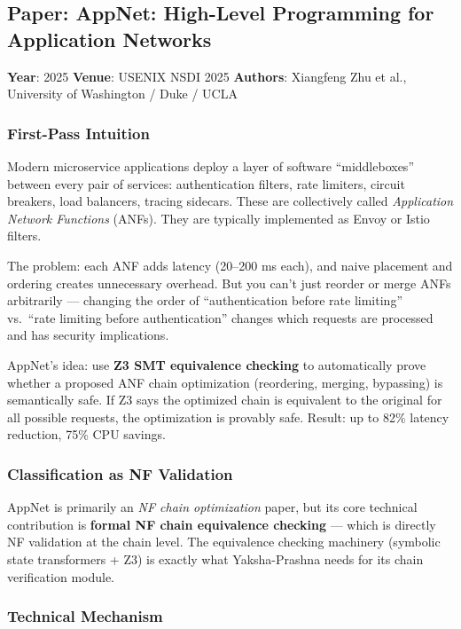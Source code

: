 \subsection*{Paper: AppNet: High-Level Programming for Application Networks}
\textbf{Year}: 2025 \quad \textbf{Venue}: USENIX NSDI 2025 \quad \textbf{Authors}: Xiangfeng Zhu et al., University of Washington / Duke / UCLA

\subsubsection{First-Pass Intuition}

Modern microservice applications deploy a layer of software ``middleboxes'' between every pair of services: authentication filters, rate limiters, circuit breakers, load balancers, tracing sidecars. These are collectively called \emph{Application Network Functions} (ANFs). They are typically implemented as Envoy or Istio filters.

The problem: each ANF adds latency (20--200 ms each), and naive placement and ordering creates unnecessary overhead. But you can't just reorder or merge ANFs arbitrarily --- changing the order of ``authentication before rate limiting'' vs.\ ``rate limiting before authentication'' changes which requests are processed and has security implications.

AppNet's idea: use \textbf{Z3 SMT equivalence checking} to automatically prove whether a proposed ANF chain optimization (reordering, merging, bypassing) is semantically safe. If Z3 says the optimized chain is equivalent to the original for all possible requests, the optimization is provably safe. Result: up to 82\% latency reduction, 75\% CPU savings.

\subsubsection{Classification as NF Validation}

AppNet is primarily an \emph{NF chain optimization} paper, but its core technical contribution is \textbf{formal NF chain equivalence checking} --- which is directly NF validation at the chain level. The equivalence checking machinery (symbolic state transformers + Z3) is exactly what Yaksha-Prashna needs for its chain verification module.

\subsubsection{Technical Mechanism}

